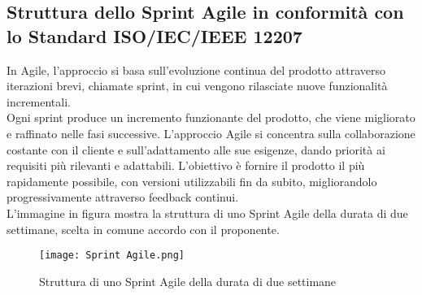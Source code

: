 \newpage

\subsection{Struttura dello Sprint Agile in conformità con lo Standard ISO/IEC/IEEE 12207}
In Agile, l'approccio si basa sull'evoluzione continua del prodotto attraverso iterazioni brevi, chiamate sprint, in cui vengono rilasciate nuove funzionalità incrementali.\\
Ogni sprint produce un incremento funzionante del prodotto, che viene migliorato e raffinato nelle fasi successive. L'approccio Agile si concentra sulla collaborazione costante con il cliente e sull'adattamento alle sue esigenze, dando priorità ai requisiti più rilevanti e adattabili. L'obiettivo è fornire il prodotto il più rapidamente possibile, con versioni utilizzabili fin da subito, migliorandolo progressivamente attraverso feedback continui.\\
L'immagine in figura  mostra la struttura di uno Sprint Agile della durata di due settimane, scelta in comune accordo con il proponente.\\
\begin{figure}[h] 
    \centering
    \texttt{[image: Sprint Agile.png]}
    \caption{Struttura di uno Sprint Agile della durata di due settimane} 
    \label{fig:Struttura di uno Sprint Agile della durata di due settimane}
\end{figure}

